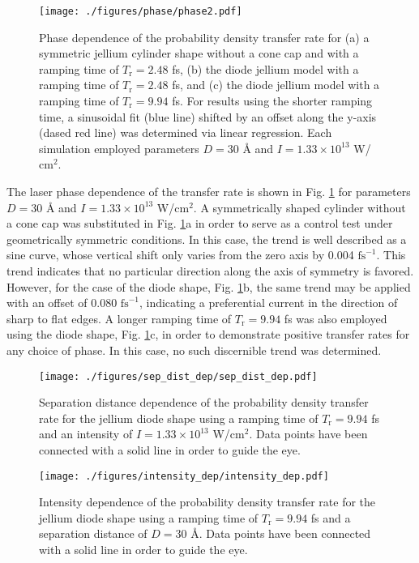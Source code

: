 \documentclass[%
 reprint,
 amsmath,amssymb,
pra,
tightenlines
]{revtex4-1}
\newcommand{\rev}[1]{{\color{red} #1}}
\begin{document}
\begin{figure}[ht]
	\texttt{[image: ./figures/phase/phase2.pdf]}
	\caption{Phase dependence of the probability density transfer rate for (a) a \rev{symmetric jellium cylinder shape without a cone cap} and with a ramping time of $T_\text{r}=2.48$ fs, (b) the diode jellium model with a ramping time of $T_\text{r}=2.48$ fs, and (c) the diode jellium model with a ramping time of $T_\text{r}=9.94$ fs. For results using the shorter ramping time, a sinusoidal fit (blue line) shifted by an offset along the y-axis (dased red line) was determined via linear regression. Each simulation employed parameters $D=30$ {\AA} and $I=1.33 \times 10^{13}$ W/$\text{cm}^2$.}
\label{fig:phase}
\end{figure} 

 The laser phase dependence of the transfer rate is shown in Fig. \ref{fig:phase} for parameters $D=30$ {\AA} and $I=1.33 \times 10^{13}$ W/$\text{cm}^2$. \rev{A symmetrically shaped cylinder without a cone cap} was substituted in Fig. \ref{fig:phase}a in order to serve as a control test under geometrically symmetric conditions. In this case, the trend is well described as a sine curve, \rev{whose} vertical shift only varies from the zero axis by 0.004 $\text{fs}^{-1}$. This trend indicates that no particular direction along the axis of symmetry is favored. However, for the case of the diode shape, Fig. \ref{fig:phase}b, the same trend may be applied with an offset of 0.080 $\text{fs}^{-1}$, indicating a preferential current in the direction of sharp to flat edges. A longer ramping time of $T_\text{r}=9.94$ fs was also employed using the diode shape, Fig. \ref{fig:phase}c, in order to demonstrate positive transfer rates for any choice of phase. In this case, no such discernible trend was determined.  

\begin{figure}[ht]
	\texttt{[image: ./figures/sep\_dist\_dep/sep\_dist\_dep.pdf]}
	\caption{Separation distance dependence of the probability density transfer rate for the jellium diode shape using a ramping time of $T_\text{r}=9.94$ fs and an intensity of $I=1.33 \times 10^{13}$ W/$\text{cm}^2$. Data points have been connected with a solid line in order to guide the eye.}
\label{fig:sep_dist_dep}
\end{figure} 


\begin{figure}[ht]
	\texttt{[image: ./figures/intensity\_dep/intensity\_dep.pdf]}
	\caption{Intensity dependence of the probability density transfer rate for the jellium diode shape using a ramping time of $T_\text{r}=9.94$ fs and a separation distance of $D=30$ \AA. Data points have been connected with a solid line in order to guide the eye.}
\label{fig:intensity_dep}
\end{figure} 
\end{document}
